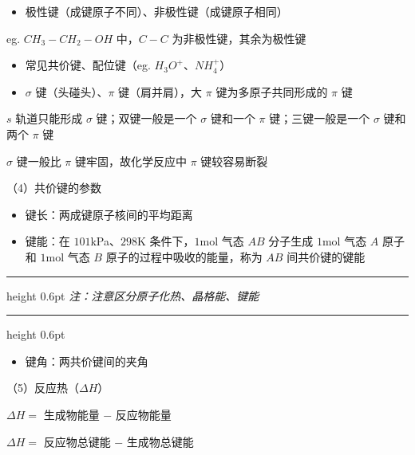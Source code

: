 \documentclass[UTF8,zihao=-4,openany]{ctexbook}
\newenvironment{notebox}
  {\par\smallskip\noindent\begingroup\begin{minipage}{\linewidth}\color{noteframe}\hrule height 0.6pt\smallskip\color{black}\itshape}
  {\par\smallskip\color{noteframe}\hrule height 0.6pt\end{minipage}\endgroup\par\smallskip}
\begin{document}
\begin{itemize}
\item 极性键（成键原子不同）、非极性键（成键原子相同）
\end{itemize}

eg. $CH_3-CH_2-OH$ 中，$C-C$ 为非极性键，其余为极性键\par

\begin{itemize}
\item 常见共价键、配位键（eg. $H_3O^+$、$NH_4^+$）
\end{itemize}

\begin{itemize}
\item $\sigma$ 键（头碰头）、$\pi$ 键（肩并肩），大 $\pi$ 键为多原子共同形成的 $\pi$ 键
\end{itemize}

$s$ 轨道只能形成 $\sigma$ 键；双键一般是一个 $\sigma$ 键和一个 $\pi$ 键；三键一般是一个 $\sigma$ 键和两个 $\pi$ 键\par

$\sigma$ 键一般比 $\pi$ 键牢固，故化学反应中 $\pi$ 键较容易断裂\par

（4）共价键的参数\par

\begin{itemize}
\item 键长：两成键原子核间的平均距离
\end{itemize}

\begin{itemize}
\item 键能：在 $101$kPa、$298$K 条件下，$1$mol 气态 $AB$ 分子生成 $1$mol 气态 $A$ 原子和 $1$mol 气态 $B$ 原子的过程中吸收的能量，称为 $AB$ 间共价键的键能
\end{itemize}

\begin{notebox}
注：注意区分原子化热、晶格能、键能\par
\end{notebox}
\begin{itemize}
\item 键角：两共价键间的夹角
\end{itemize}

（5）反应热（$\Delta H$）\par

$\Delta H=$ 生成物能量 $-$ 反应物能量\par

$\Delta H=$ 反应物总键能 $-$ 生成物总键能\par
\end{document}
